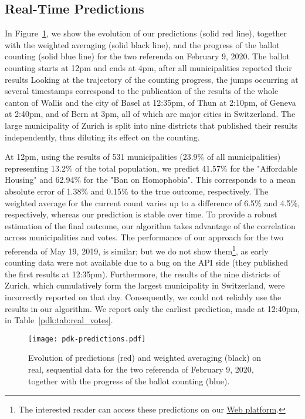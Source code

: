 \subsection{Real-Time Predictions}

In Figure~\ref{pdk:fig:predictions}, we show the evolution of our predictions (solid red line), together with the weighted averaging (solid black line), and the progress of the ballot counting (solid blue line) for the two referenda on February 9, 2020.
The ballot counting starts at 12pm and ends at 4pm, after all municipalities reported their results
Looking at the trajectory of the counting progress, the jumps occurring at several timestamps correspond to the publication of the results of the whole canton of Wallis and the city of Basel at 12:35pm, of Thun at 2:10pm, of Geneva at 2:40pm, and of Bern at 3pm, all of which are major cities in Switzerland.
The large municipality of Zurich is split into nine districts that published their results independently, thus diluting its effect on the counting.

At 12pm, using the results of 531 municipalities (23.9\% of all municipalities) representing 13.2\% of the total population, we predict 41.57\% for the "Affordable Housing" and 62.94\% for the "Ban on Homophobia".
This corresponds to a mean absolute error of 1.38\% and 0.15\% to the true outcome, respectively.
The weighted average for the current count varies up to a difference of 6.5\% and 4.5\%, respectively, whereas our prediction is stable over time.
To provide a robust estimation of the final outcome, our algorithm takes advantage of the correlation across municipalities and votes.
The performance of our approach for the two referenda of May 19, 2019, is similar; but we do not show them\footnote{The interested reader can access these predictions on our \href{http://www.predikon.ch}{Web platform}.}, as early counting data were not available due to a bug on the API side (they published the first results at 12:35pm).
Furthermore, the results of the nine districts of Zurich, which cumulatively form the largest municipality in Switzerland, were incorrectly reported on that day.
Consequently, we could not reliably use the results in our algorithm.
We report only the earliest prediction, made at 12:40pm, in Table~\ref{pdk:tab:real_votes}.

\begin{figure}
	\centering
	\texttt{[image: pdk-predictions.pdf]}
	\caption{
		Evolution of predictions (red) and weighted averaging (black) on real, sequential data for the two referenda of February 9, 2020, together with the progress of the ballot counting (blue).
	}
	\label{pdk:fig:predictions}
\end{figure}

